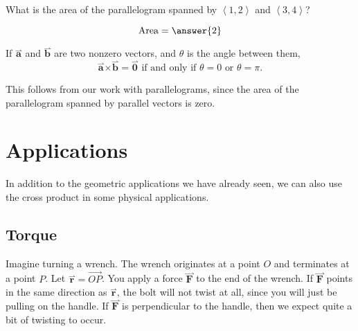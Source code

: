 \documentclass{ximera}
\begin{document}
\begin{question}
  What is the area of the parallelogram spanned by $\left< 1,2 \right>$ and
  $\left< 3,4 \right>$?
  \begin{prompt}
    \[
    \text{Area} = \answer{2}
    \]
  \end{prompt}
\end{question}

\begin{theorem}
  If $\overset{\boldsymbol{\rightharpoonup}}{\mathbf{a}}$ and $\overset{\boldsymbol{\rightharpoonup}}{\mathbf{b}}$ are two nonzero vectors, and $\theta$ is
  the angle between them,
  \[
  \overset{\boldsymbol{\rightharpoonup}}{\mathbf{a}} \boldsymbol\times \overset{\boldsymbol{\rightharpoonup}}{\mathbf{b}} = \overset{\boldsymbol{\rightharpoonup}}{\mathbf{0}} \text{ if and only if $\theta=
  0$ or $\theta=\pi$}.
  \]
  \begin{explanation}
    This follows from our work with parallelograms, since the area of the parallelogram spanned by
    parallel vectors is zero.
  \end{explanation}
\end{theorem}




\section{Applications}

In addition to the geometric applications we have already seen, we can
also use the cross product in some physical applications.



\subsection{Torque}

Imagine turning a wrench.  The wrench originates at a point $O$ and
terminates at a point $P$.  Let $\overset{\boldsymbol{\rightharpoonup}}{\mathbf{r}} = \overrightarrow{OP}$.  You
apply a force $\overset{\boldsymbol{\rightharpoonup}}{\mathbf{F}}$ to the end of the wrench.  If $\overset{\boldsymbol{\rightharpoonup}}{\mathbf{F}}$ points
in the same direction as $\overset{\boldsymbol{\rightharpoonup}}{\mathbf{r}}$, the bolt will not twist at all,
since you will just be pulling on the handle.  If $\overset{\boldsymbol{\rightharpoonup}}{\mathbf{F}}$ is
perpendicular to the handle, then we expect quite a bit of twisting to
occur.
\end{document}
